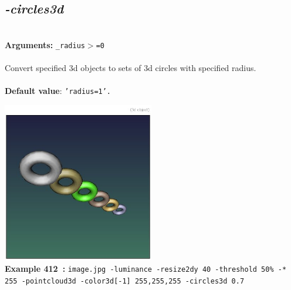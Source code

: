 \documentclass[a4paper,11pt,twoside]{book}
\begin{document}
\subsection{\emph{-circles3d} }\vspace*{-0.5em}
~\\\textbf{Arguments: } 
{\small \texttt{\_radius$>$=0}}\\~\\
Convert specified 3d objects to sets of 3d circles with specified radius.
~\\~\\\textbf{Default value}: {\small \texttt{'radius=1'.}}
\begin{center}\includegraphics[keepaspectratio=true,height=7cm,width=\textwidth]{img/gmic_def412.jpg}\\
{\footnotesize \textbf{Example 412~:} \texttt{image.jpg -luminance -resize2dy 40 -threshold 50\% -* 255 -pointcloud3d -color3d[-1] 255,255,255 -circles3d 0.7}}
\end{center}
\end{document}
